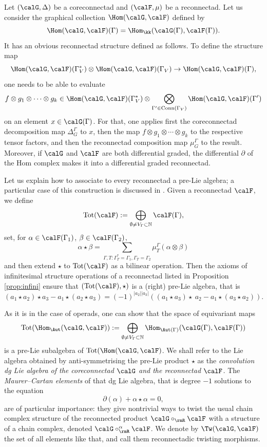 Let $(\calG,\Delta)$ be a coreconnectad and $(\calF,\mu)$ be a reconnectad. Let us consider the graphical collection $\Hom(\calG,\calF)$ defined by
 \[
\Hom(\calG,\calF)(\Gamma)=\Hom_{\kk}(\calG(\Gamma),\calF(\Gamma)). 
 \]
It has an obvious reconnectad structure defined as follows. To define the structure map
 \[
\Hom(\calG,\calF)(\Gamma^*_V)\otimes \Hom(\calG,\calF)(\Gamma_V)\to \Hom(\calG,\calF)(\Gamma),
 \]
one needs to be able to evaluate 
 \[
f\otimes g_1\otimes\cdots\otimes g_k\in \Hom(\calG,\calF)(\Gamma^*_V)\otimes\bigotimes_{\Gamma'\in\mathrm{Conn}(\Gamma_V)} \Hom(\calG,\calF)(\Gamma')
 \]
on an element $x\in\calG(\Gamma)$. For that, one applies first the coreconnectad decomposition map $\Delta_G^\Gamma$ to $x$, then the map $f\otimes g_1\otimes\cdots\otimes g_k$ to the respective tensor factors, and then the reconnectad composition map $\mu_G^\Gamma$ to the result. Moreover, if $\calG$ and $\calF$ are both differential graded, the differential $\partial$ of the Hom complex makes it into a differential graded reconnectad.

Let us explain how to associate to every reconnectad a pre-Lie algebra; a particular case of this construction is discussed in \cite[Rem.~3.1.3]{jlms.12596}. Given a reconnectad $\calF$, we define
 \[
\mathrm{Tot}(\calF):=\bigoplus_{\emptyset\ne V_\Gamma\subset\mathbb{N}}\calF(\Gamma),
 \]
set, for $\alpha\in\calF(\Gamma_1)$, $\beta\in\calF(\Gamma_2)$,
 \[
\alpha\star\beta=\sum_{\Gamma, T\colon \Gamma^*_T=\Gamma_1,\Gamma_T=\Gamma_2}\mu_T^\Gamma(\alpha\otimes\beta)
 \]
and then extend $\star$ to $\mathrm{Tot}(\calF)$ as a bilinear operation. Then the axioms of infinitesimal structure operations of a reconnectad listed in Proposition \ref{prop:infini} ensure that $(\mathrm{Tot}(\calF),\star)$ is a (right) pre-Lie algebra, that is
 \[
(a_1\star a_2)\star a_3-a_1\star(a_2\star a_3)=(-1)^{|a_2||a_3|}((a_1\star a_3)\star\ a_2-a_1\star(a_3\star a_2)).
 \] 

As it is in the case of operads, one can show that the space of equivariant maps 
 \[
\mathrm{Tot}(\Hom_{\Aut}(\calG,\calF)):=\bigoplus_{\emptyset\ne V_\Gamma\subset\mathbb{N}}\Hom_{\Aut(\Gamma)}(\calG(\Gamma),\calF(\Gamma))
 \]
is a pre-Lie subalgebra of $\mathrm{Tot}(\Hom(\calG,\calF)$. We shall refer to the Lie algebra obtained by anti-symmetrising the pre-Lie product $\star$ as the \emph{convolution dg Lie algebra of the coreconnectad $\calG$ and the reconnectad $\calF$. } The \emph{Maurer--Cartan elements} of that dg Lie algebra, that is degree $-1$ solutions to the equation
 \[
\partial(\alpha)+\alpha\star\alpha=0,
 \]
are of particular importance: they give nontrivial ways to twist the usual chain complex structure of the reconnected product $\calG\circ_{\rmR}\calF$ with a structure of a chain complex, denoted $\calG\circ^\alpha_{\rmR}\calF$. We denote by $\Tw(\calG,\calF)$ the set of all elements like that, and call them reconnectadic twisting morphisms.

